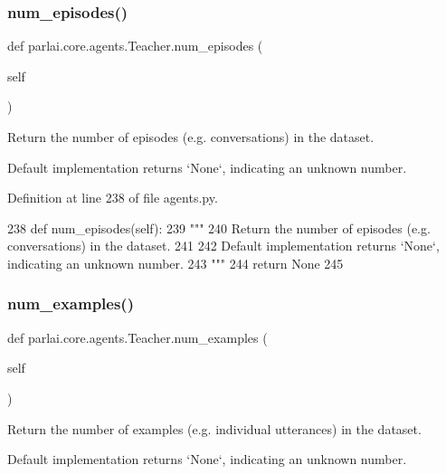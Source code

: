 \subsubsection{\texorpdfstring{num\+\_\+episodes()}{num\_episodes()}}
{\footnotesize\ttfamily def parlai.\+core.\+agents.\+Teacher.\+num\+\_\+episodes (\begin{DoxyParamCaption}\item[{}]{self }\end{DoxyParamCaption})}

\begin{DoxyVerb}Return the number of episodes (e.g. conversations) in the dataset.

Default implementation returns `None`, indicating an unknown number.
\end{DoxyVerb}
 

Definition at line 238 of file agents.\+py.


\begin{DoxyCode}
238     \textcolor{keyword}{def }num\_episodes(self):
239         \textcolor{stringliteral}{"""}
240 \textcolor{stringliteral}{        Return the number of episodes (e.g. conversations) in the dataset.}
241 \textcolor{stringliteral}{}
242 \textcolor{stringliteral}{        Default implementation returns `None`, indicating an unknown number.}
243 \textcolor{stringliteral}{        """}
244         \textcolor{keywordflow}{return} \textcolor{keywordtype}{None}
245 
\end{DoxyCode}
\mbox{\label{classparlai_1_1core_1_1agents_1_1Teacher_a93370e4e99236e8ad267b40cd4437920}} 
\subsubsection{\texorpdfstring{num\+\_\+examples()}{num\_examples()}}
{\footnotesize\ttfamily def parlai.\+core.\+agents.\+Teacher.\+num\+\_\+examples (\begin{DoxyParamCaption}\item[{}]{self }\end{DoxyParamCaption})}

\begin{DoxyVerb}Return the number of examples (e.g. individual utterances) in the dataset.

Default implementation returns `None`, indicating an unknown number.
\end{DoxyVerb}
 

